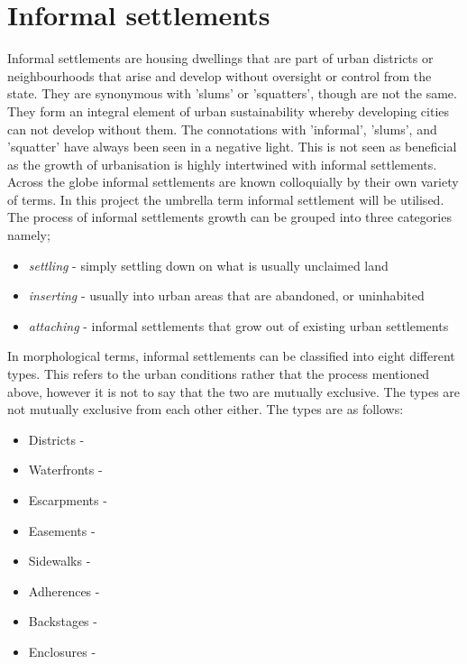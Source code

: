 \section{Informal settlements}
Informal settlements are housing dwellings that are part of urban districts or neighbourhoods that arise and develop without oversight or control from the state. They are synonymous with 'slums' or 'squatters', though are not the same. They form an integral element of urban sustainability whereby developing cities can not develop without them. The connotations with 'informal', 'slums', and 'squatter' have always been seen in a negative light. This is not seen as beneficial as the growth of urbanisation is highly intertwined with informal settlements.\citep{dovey2011forms}\\
Across the globe informal settlements are known colloquially by their own variety of terms. \citep{un} In this project the umbrella term informal settlement will be utilised.\\
The process of informal settlements growth can be grouped into three categories namely;\citep{dovey2011forms}
\begin{itemize}
\item \textsl{settling} - simply settling down on what is usually unclaimed land
\item \textsl{inserting} - usually into urban areas that are abandoned, or uninhabited
\item \textsl{attaching} - informal settlements that grow out of existing urban settlements
\end{itemize}
In morphological terms, informal settlements can be classified into eight different types. This refers to the urban conditions rather that the process mentioned above, however it is not to say that the two are mutually exclusive. The types are not mutually exclusive from each other either. The types are as follows:\citep{dovey2011forms}
\begin{itemize}
\item Districts - 
\item Waterfronts - 
\item Escarpments - 
\item Easements - 
\item Sidewalks - 
\item Adherences -
\item Backstages -
\item Enclosures - 
\end{itemize}
